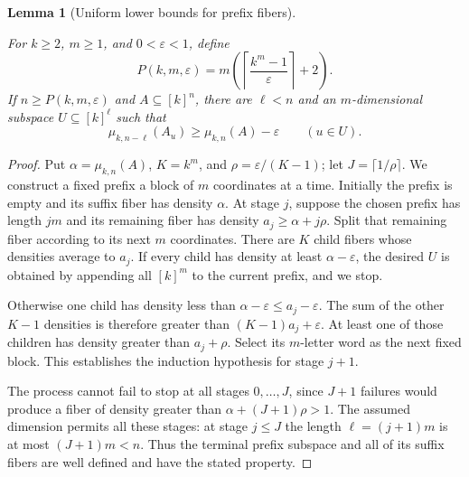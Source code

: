 \documentclass[11pt]{amsart}
\newtheorem{lemma}[theorem]{Lemma}
\theoremstyle{definition}
\theoremstyle{remark}
\numberwithin{equation}{section}
\providecommand{\lean}[1]{}
\providecommand{\leanok}{}
\begin{document}
\begin{lemma}[Uniform lower bounds for prefix fibers]\label{cj:fiber}
\lean{Auto.C_cj_fiber,Auto.cj_fiber}
\leanok
For $k\ge2$, $m\ge1$, and $0<\varepsilon<1$, define
\[
 P(k,m,\varepsilon)
 =m\left(\left\lceil\frac{k^m-1}{\varepsilon}\right\rceil+2\right).
\]
If $n\ge P(k,m,\varepsilon)$ and $A\subseteq[k]^n$, there are
$\ell<n$ and an $m$-dimensional subspace $U\subseteq[k]^\ell$ such
that
\[
 \mu_{k,n-\ell}(A_u)\ge\mu_{k,n}(A)-\varepsilon
 \qquad(u\in U).
\]
\end{lemma}
\begin{proof}
Put $\alpha=\mu_{k,n}(A)$, $K=k^m$, and
$\rho=\varepsilon/(K-1)$; let $J=\lceil1/\rho\rceil$.
We construct a fixed prefix a block of $m$ coordinates at a time.
Initially the prefix is empty and its suffix fiber has density
$\alpha$.  At stage $j$, suppose the chosen prefix has length $jm$
and its remaining fiber has density $a_j\ge\alpha+j\rho$.
Split that remaining fiber according to its next $m$ coordinates.
There are $K$ child fibers whose densities average to $a_j$.
If every child has density at least $\alpha-\varepsilon$, the desired
$U$ is obtained by appending all $[k]^m$ to the current prefix, and
we stop.

Otherwise one child has density less than
$\alpha-\varepsilon\le a_j-\varepsilon$.  The sum of the other
$K-1$ densities is therefore greater than
$(K-1)a_j+\varepsilon$.  At least one of those children has density
greater than $a_j+\rho$.  Select its $m$-letter word as the next
fixed block.  This establishes the induction hypothesis for stage
$j+1$.

The process cannot fail to stop at all stages $0,\ldots,J$, since
$J+1$ failures would produce a fiber of density greater than
$\alpha+(J+1)\rho>1$.  The assumed dimension permits all these
stages: at stage $j\le J$ the length
$\ell=(j+1)m$ is at most $(J+1)m<n$.
Thus the terminal prefix subspace and all of its suffix fibers are
well defined and have the stated property.
\end{proof}
\end{document}
